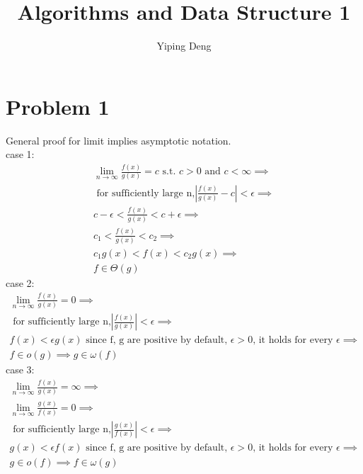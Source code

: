 \documentclass{article}
\newcommand{\hwnumber}{1}
\begin{document}
\title{Algorithms and Data Structure \hwnumber}
\author{Yiping Deng}
\maketitle
\thispagestyle{fancy}
\section*{Problem 1}
General proof for limit implies asymptotic notation. \\
case 1:
\begin{align*}
    \lim_{n \to \infty} \frac{f(x)}{g(x)} = c \text{ s.t. } c > 0 \text{ and } c < \infty \implies \\
    \text{ for sufficiently large n,} | \frac{f(x)}{g(x)} - c | < \epsilon \implies \\
    c - \epsilon < \frac{f(x)}{g(x)} < c + \epsilon \implies \\
    c_1 < \frac{f(x)}{g(x)} < c_2 \implies \\
    c_1 g(x) < f(x) < c_2 g(x) \implies \\
    f \in \Theta(g)
\end{align*}
case 2:
\begin{align*}
    \lim_{n \to \infty} \frac{f(x)}{g(x)} = 0 \implies \\
    \text{ for sufficiently large n,} | \frac{f(x)}{g(x)}| < \epsilon \implies \\
    f(x) < \epsilon g(x) \text{ since f, g are positive by default, } \epsilon > 0 \text{, it holds for every }\epsilon \implies \\
    f \in o(g) \implies g \in \omega(f)
\end{align*}
case 3:
\begin{align*}
    \lim_{n \to \infty} \frac{f(x)}{g(x)} = \infty \implies \\
    \lim_{n \to \infty} \frac{g(x)}{f(x)} = 0 \implies \\
    \text{ for sufficiently large n,} | \frac{g(x)}{f(x)}| < \epsilon \implies \\
    g(x) < \epsilon f(x) \text{ since f, g are positive by default, } \epsilon > 0 \text{, it holds for every }\epsilon \implies \\
    g \in o(f) \implies f \in \omega(g)
\end{align*}
\end{document}
